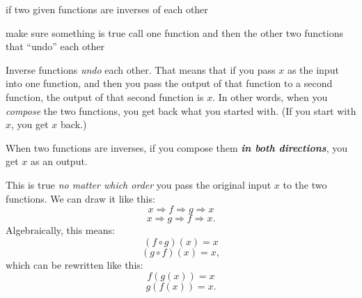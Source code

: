 \documentclass[fleqn,letterpaper,12pt,printwatermark=false]{memoir}
\begin{document}
\newcommand{\myClassName}{Pre-AP Algebra 2}
\newcommand{\myUnitNumber}{1}
\newcommand{\myUnitTitle}{Introduction to Functions}
\newcommand{\myLessonNumber}{11}
\newcommand{\myLessonTitle}{Verifying Inverses}



\pagestyle{myPagestyle}

\checkandfixthelayout
{}

\begin{myNotesHeader}
    \item {} if two given functions are inverses of each other
\end{myNotesHeader}

\begin{myVocabulary}
        {
            make sure something is true
        }
        {
            call one function and then the other
        }
        {
            two functions that ``undo'' each other
        }
\end{myVocabulary}

\begin{myLesson}
    Inverse functions \emph{undo} each other.
    That means that if you pass $x$ as the input into one function,
    and then you pass the output of that function to a second function,
    the output of that second function is $x$.
    In other words,
    when you \emph{compose} the two functions,
    you get back what you started with.
    (If you start with $x$, you get $x$ back.)

    \begin{myLessonBox}
        When two functions are inverses,
        if you compose them 
        {\bfseries\itshape in both directions},
        you get $x$ as an output.
    \end{myLessonBox}

    This is true 
    \emph{no matter which order} you pass the original input $x$
    to the two functions.
    We can draw it like this:
    \[
        x \Longrightarrow f \Longrightarrow g \Longrightarrow x
    \]
    \[
        x \Longrightarrow g \Longrightarrow f \Longrightarrow x.
    \]
    Algebraically, this means:
    \[
        (f \circ g)(x) = x
    \]
    \[
        (g \circ f)(x) = x,
    \]
    which can be rewritten like this:
    \[
        f(g(x)) = x
    \]
    \[
        g(f(x)) = x.
    \]
\end{myLesson}
\end{document}
